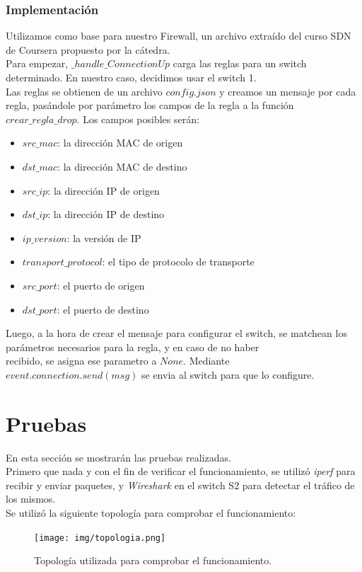 \documentclass[titlepage,a4paper]{article}
\begin{document}
\subsubsection{Implementación}
Utilizamos como base para nuestro Firewall, un archivo extraído del curso SDN de Coursera propuesto por la cátedra.\\
Para empezar, $\_handle\_ConnectionUp$ carga las reglas para un switch determinado. En nuestro caso, decidimos usar el switch 1. \\
Las reglas se obtienen de un archivo $config.json$ y creamos un mensaje por cada regla, pasándole por parámetro los campos de la regla a la función $crear\_regla\_drop$. Los campos posibles serán:
\begin{itemize}
    \item $src\_mac$: la dirección MAC de origen
    \item $dst\_mac$: la dirección MAC de destino
    \item $src\_ip$: la dirección IP de origen
    \item $dst\_ip$: la dirección IP de destino
    \item $ip\_version$: la versión de IP
    \item $transport\_protocol$: el tipo de protocolo de transporte
    \item $src\_port$: el puerto de origen
    \item $dst\_port$: el puerto de destino
\end{itemize}
Luego, a la hora de crear el mensaje para configurar el switch, se matchean los parámetros necesarios para la regla, y en caso de no haber\\ recibido, se asigna ese parametro a $None$.
Mediante $event.connection.send(msg)$ se envia al switch para que lo configure.

\section{Pruebas}\label{sec:pruebas}

En esta sección se mostrarán las pruebas realizadas.
\\
Primero que nada y con el fin de verificar el funcionamiento, se utilizó \textit{iperf} para recibir y enviar paquetes, y \textit{Wireshark} en el switch S2 para detectar el tráfico de los mismos.
\\
Se utilizó la siguiente topología para comprobar el funcionamiento:

\begin{figure}[H]
    \centering
    \texttt{[image: img/topologia.png]}
    \caption{Topología utilizada para comprobar el funcionamiento.}
\end{figure}
\end{document}
